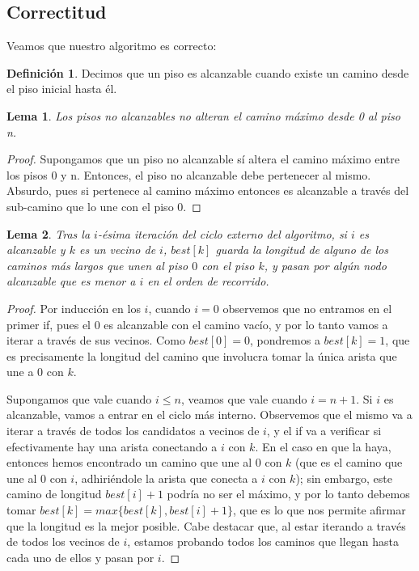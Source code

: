 \documentclass{article}
\newtheorem{lemma}{Lema}[theorem]
\theoremstyle{definition}
\newtheorem{definition}{Definición}[section]
\theoremstyle{remark}
\begin{document}
\subsection{Correctitud}

Veamos que nuestro algoritmo es correcto:

\begin{definition}
Decimos que un piso es alcanzable cuando existe un camino desde el piso inicial hasta él.
\end{definition}

\begin{lemma}
Los pisos no alcanzables no alteran el camino máximo desde 0 al piso n.
\end{lemma}

\begin{proof}
Supongamos que un piso no alcanzable sí altera el camino máximo entre los pisos 0 y n. Entonces, el piso no alcanzable debe pertenecer al mismo. Absurdo, pues si pertenece al camino máximo entonces es alcanzable a través del sub-camino que lo une con el piso 0.
\end{proof}

\begin{lemma}
Tras la $i$-ésima iteración del ciclo externo del algoritmo, si $i$ es alcanzable y $k$ es un vecino de $i$, $best[k]$ guarda la longitud de alguno de los caminos más largos que unen al piso $0$ con el piso $k$, y pasan por algún nodo alcanzable que es menor a $i$ en el orden de recorrido.
\end{lemma}

\begin{proof}
Por inducción en los $i$, cuando $i = 0$ observemos que no entramos en el primer if, pues el 0 es alcanzable con el camino vacío, y por lo tanto vamos a iterar a través de sus vecinos. Como $best[0] = 0$, pondremos a $best[k] = 1$, que es precisamente la longitud del camino que involucra tomar la única arista que une a $0$ con $k$. 

Supongamos que vale cuando $i \leq n$, veamos que vale cuando $i = n + 1$. Si $i$ es alcanzable, vamos a entrar en el ciclo más interno. Observemos que el mismo va a iterar a través de todos los candidatos a vecinos de $i$, y el if va a verificar si efectivamente hay una arista conectando a $i$ con $k$. En el caso en que la haya, entonces hemos encontrado un camino que une al 0 con $k$ (que es el camino que une al 0 con $i$, adhiriéndole la arista que conecta a $i$ con $k$); sin embargo, este camino de longitud $best[i] + 1$ podría no ser el máximo, y por lo tanto debemos tomar $best[k] = max\{best[k], best[i] + 1\}$, que es lo que nos permite afirmar que la longitud es la mejor posible. Cabe destacar que, al estar iterando a través de todos los vecinos de $i$, estamos probando todos los caminos que llegan hasta cada uno de ellos y pasan por $i$.
\end{proof}
\end{document}
